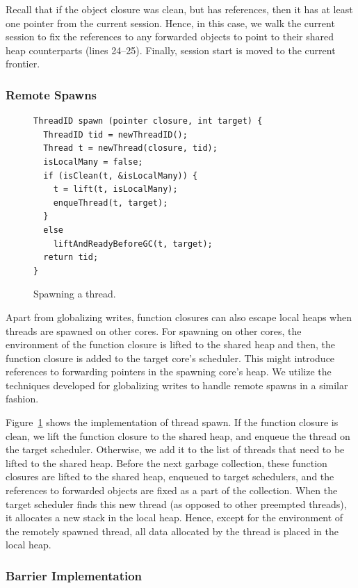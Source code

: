 Recall that if the object closure was clean, but has 
references, then it has at least one pointer from the current session. Hence,
in this case, we walk the current session to fix the references to any
forwarded objects to point to their shared heap counterparts (lines 24--25).
Finally, session start is moved to the current frontier.

\subsubsection{Remote Spawns}
\label{sec:remote_spawns}

\begin{figure}[t]
\begin{lstlisting}
ThreadID spawn (pointer closure, int target) {
  ThreadID tid = newThreadID();
  Thread t = newThread(closure, tid);
  isLocalMany = false;
  if (isClean(t, &isLocalMany)) {
    t = lift(t, isLocalMany);
    enqueThread(t, target);
  }
  else
    liftAndReadyBeforeGC(t, target);
  return tid;
}
\end{lstlisting}
\caption{Spawning a thread.}
\label{code:spawn}
\end{figure}

Apart from globalizing writes, function closures can also escape local heaps when
threads are spawned on other cores. For spawning on other cores, the
environment of the function closure is lifted to the shared heap and then, the
function closure is added to the target core's scheduler. This might introduce
references to forwarding pointers in the spawning core's heap. We utilize the
techniques developed for globalizing writes to handle remote spawns in a similar
fashion.

Figure~\ref{code:spawn} shows the implementation of thread spawn. If the
function closure is clean, we lift the function closure to the shared heap, and
enqueue the thread on the target scheduler. Otherwise, we add it to the list of
threads that need to be lifted to the shared heap. Before the next garbage
collection, these function closures are lifted to the shared heap, enqueued to
target schedulers, and the references to forwarded objects are fixed as a part
of the collection. When the target scheduler finds this new thread (as opposed
to other preempted threads), it allocates a new stack in the local heap. Hence,
except for the environment of the remotely spawned thread, all data allocated
by the thread is placed in the local heap.

\subsubsection{Barrier Implementation}

